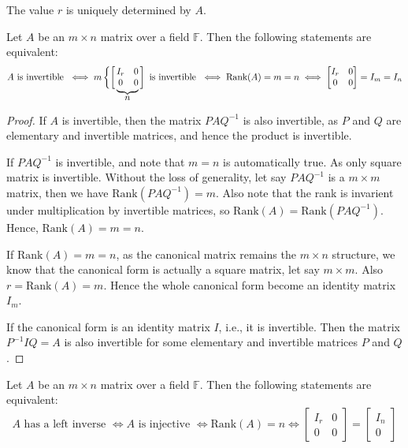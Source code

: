 \documentclass[
	11pt, %
	fleqn, %
	a4paper, %
]{LegrandOrangeBook}
\newcommand{\F}{\mathbb{F}} %
\newcommand{\rank}[1]{\text{Rank}(#1)} %
\begin{document}
\begin{remark}
    The value $r$ is uniquely determined by $A$.
\end{remark}

\def\matriximg{%
    \begin{matrix}
        I_r & 0 \\
        0 & 0 
    \end{matrix}
}

\begin{proposition}
    Let $A$ be an $m \times n$ matrix over a field $\F$. Then the following statements are equivalent:
    \[
        A \text{ is invertible } \iff m \left\{\left[\vphantom{\matriximg}\right.\right.\kern-2\nulldelimiterspace
        \underbrace{\matriximg}_{\text{\normalsize $n$}}\kern-\nulldelimiterspace\left.\vphantom{\matriximg}\right] \text{ is invertible } \iff \rank{A} = m = n \iff \begin{bmatrix}
            I_r & 0 \\
            0 & 0
        \end{bmatrix} = I_m = I_n
    \]
\end{proposition}

\begin{proof}
    If $A$ is invertible, then the matrix $PAQ^{-1}$ is also invertible, as $P$ and $Q$ are elementary and invertible matrices, and hence the product is invertible. 
    
    If $PAQ^{-1}$ is invertible, and note that $m = n$ is automatically true. As only square matrix is invertible. Without the loss of generality, let say $PAQ^{-1}$ is a $m \times m$ matrix, then we have $\rank{PAQ^{-1}} = m$. Also note that the rank is invarient under multiplication by invertible matrices, so $\rank{A} = \rank{PAQ^{-1}}$. Hence, $\rank{A} = m = n$.

    If $\rank{A} = m = n$, as the canonical matrix remains the $m \times n$ structure, we know that the canonical form is actually a square matrix, let say $m \times m$. Also $r = \rank{A} = m$. Hence the whole canonical form become an identity matrix $I_m$.

    If the canonical form is an identity matrix $I$, i.e., it is invertible. Then the matrix $P^{-1}IQ = A$ is also invertible for some elementary and invertible matrices $P$ and $Q$.
\end{proof}

\begin{proposition}
    Let $A$ be an $m \times n$ matrix over a field $\F$. Then the following statements are equivalent:
    \[
        A \text{ has a left inverse } \iff A \text{ is injective } \iff \rank{A} = n \iff \begin{bmatrix}
            I_r & 0 \\
            0 & 0
        \end{bmatrix} = \begin{bmatrix}
            I_n \\
            0
        \end{bmatrix}
    \]
\end{proposition}
\end{document}

